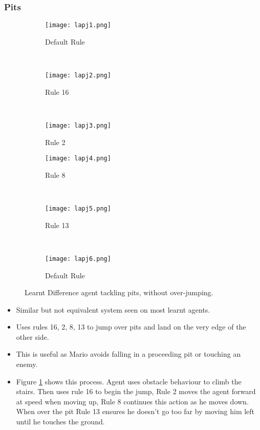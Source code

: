 \clearpage
\subsubsection*{\hspace{6pt}Pits}

\begin{figure}[t]
	\begin{adjustwidth}{-2cm}{-2cm}
    \centering
          \begin{subfigure}[b]{0.328\textwidth}
                  \centering
                  \texttt{[image: lapj1.png]}
                  \caption{Default Rule}
          \end{subfigure}~
          \begin{subfigure}[b]{0.328\textwidth}
                  \centering
                  \texttt{[image: lapj2.png]}
                  \caption{Rule 16}
          \end{subfigure}~
          \begin{subfigure}[b]{0.328\textwidth}
                  \centering
                  \texttt{[image: lapj3.png]}
                  \caption{Rule 2}
          \end{subfigure}
          \begin{subfigure}[b]{0.328\textwidth}
                  \centering
                  \texttt{[image: lapj4.png]}
                  \caption{Rule 8}
          \end{subfigure}~
          \begin{subfigure}[b]{0.328\textwidth}
                  \centering
                  \texttt{[image: lapj5.png]}
                  \caption{Rule 13}
          \end{subfigure}~
          \begin{subfigure}[b]{0.328\textwidth}
                  \centering
                  \texttt{[image: lapj6.png]}
                  \caption{Default Rule}
          \end{subfigure}
    \caption{Learnt Difference agent tackling pits, without over-jumping.}\label{fig:lapj}
    \end{adjustwidth}
\end{figure}


\begin{itemize}
\item Similar but not equivalent system seen on most learnt agents.
\item Uses rules 16, 2, 8, 13 to jump over pits and land on the very edge of the other side.
\item This is useful as Mario avoids falling in a proceeding pit or touching an enemy.
\item Figure \ref{fig:lapj} shows this process. Agent uses obstacle behaviour to climb the stairs. Then uses rule 16 to begin the jump, Rule 2 moves the agent forward at speed when moving up, Rule 8 continues this action as he moves down. When over the pit Rule 13 ensures he doesn't go too far by moving him left until he touches the ground.
\end{itemize}


